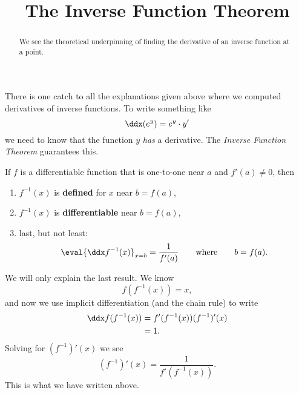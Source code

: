 \documentclass{ximera}
\title[Dig-In:]{The Inverse Function Theorem}
\begin{document}
\begin{abstract}
  We see the theoretical underpinning of finding the derivative of an
  inverse function at a point.
\end{abstract}
\maketitle

There is one catch to all the explanations given above where we
computed derivatives of inverse functions. To write something like
\[
\ddx(e^y)=e^y\cdot y'
\]
we need to know that the function $y$ \textit{has} a derivative.  The
\textit{Inverse Function Theorem} guarantees this.

\begin{theorem}\label{theorem:IFT}
If $f$ is a differentiable function that is one-to-one near $a$ and
$f'(a) \neq 0$, then
\begin{enumerate}
\item $f^{-1}(x)$ is \textbf{defined} for $x$ near $b=f(a)$,
\item $f^{-1}(x)$ is \textbf{differentiable} near $b=f(a)$, 
\item last, but not least:
  \[
  \eval{\ddx f^{-1}(x)}_{x=b}  = \frac{1}{f'(a)}\qquad\text{where}\qquad b = f(a).
  \]
\end{enumerate}
\begin{explanation}
  We will only explain the last result. We know
  \[
  f(f^{-1}(x)) = x,
  \]
  and now we use implicit differentiation (and the chain rule) to
  write
  \begin{align*}
  \ddx f(f^{-1}(x)) &= f'(f^{-1}(x)) (f^{-1})'(x)\\
  &=1.
  \end{align*}
  Solving for $(f^{-1})'(x)$ we see
  \[
  (f^{-1})'(x) = \frac{1}{f'(f^{-1}(x))}.
  \]
  This is what we have written above.
\end{explanation}
\end{theorem}
\end{document}
